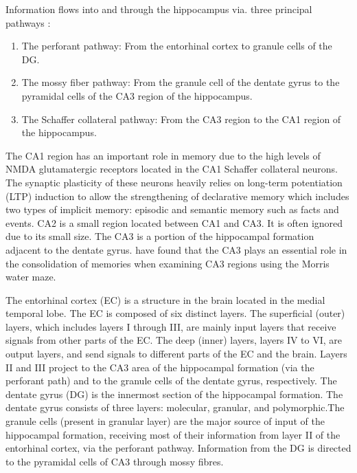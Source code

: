 \documentclass[12pt]{article}
\begin{document}
Information flows into and through the hippocampus via. three
principal pathways \cite{limbicsystem:hippocampus}:

\begin{enumerate}
  \item The perforant pathway: From the entorhinal cortex to granule
    cells of the DG.

  \item The mossy fiber pathway: From the granule cell of the dentate
    gyrus to the pyramidal cells of the CA3 region of the hippocampus.

  \item The Schaffer collateral pathway: From the CA3 region to the
    CA1 region of the hippocampus.

\end{enumerate}

The CA1 region has an important role in memory due to the high levels
of NMDA glutamatergic receptors located in the CA1 Schaffer collateral
neurons. The synaptic plasticity of these neurons heavily relies on
long-term potentiation (LTP) induction to allow the strengthening of
declarative memory which includes two types of implicit memory:
episodic and semantic memory such as facts and events. CA2 is a small
region located between CA1 and CA3. It is often ignored due to its
small size. The CA3 is a portion of the hippocampal formation adjacent
to the dentate gyrus. \textcite{hippocampalca3} have found that the
CA3 plays an essential role in the consolidation of memories when
examining CA3 regions using the Morris water maze.

The entorhinal cortex (EC) is a structure in the brain located in the
medial temporal lobe. The EC is composed of six distinct layers. The
superficial (outer) layers, which includes layers I through III, are
mainly input layers that receive signals from other parts of the
EC. The deep (inner) layers, layers IV to VI, are output layers, and
send signals to different parts of the EC and the brain. Layers II and
III project to the CA3 area of the hippocampal formation (via the
perforant path) and to the granule cells of the dentate gyrus,
respectively. The dentate gyrus (DG) is the innermost section of the
hippocampal formation. The dentate gyrus consists of three layers:
molecular, granular, and polymorphic.The granule cells (present in
granular layer) are the major source of input of the hippocampal
formation, receiving most of their information from layer II of the
entorhinal cortex, via the perforant pathway. Information from the DG
is directed to the pyramidal cells of CA3 through mossy fibres.
\end{document}
